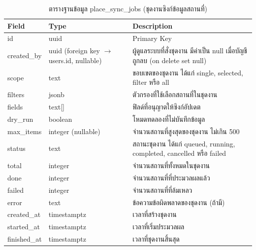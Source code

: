 \begin{table}[H]
\centering
\caption{ตารางฐานข้อมูล place\_sync\_jobs (ชุดงานซิงก์ข้อมูลสถานที่)}
\label{tab:db_sync}
\begin{tabular}{|p{3.6cm}|p{2.6cm}|p{6.8cm}|}
\hline
\textbf{Field} & \textbf{Type} & \textbf{Description} \\
\hline
id & uuid & Primary Key \\ \hline
created\_by & uuid (foreign key $\to$ users.id, nullable) & ผู้ดูแลระบบที่สั่งชุดงาน มีค่าเป็น null เมื่อบัญชีถูกลบ (on delete set null) \\ \hline
scope & text & ขอบเขตของชุดงาน ได้แก่ single, selected, filter หรือ all \\ \hline
filters & jsonb & ตัวกรองที่ใช้เลือกสถานที่ในชุดงาน \\ \hline
fields & text[] & ฟิลด์ที่อนุญาตให้ซิงก์อัปเดต \\ \hline
dry\_run & boolean & โหมดทดลองที่ไม่บันทึกข้อมูล \\ \hline
max\_items & integer (nullable) & จำนวนสถานที่สูงสุดของชุดงาน ไม่เกิน 500 \\ \hline
status & text & สถานะชุดงาน ได้แก่ queued, running, completed, cancelled หรือ failed \\ \hline
total & integer & จำนวนสถานที่ทั้งหมดในชุดงาน \\ \hline
done & integer & จำนวนสถานที่ที่ประมวลผลแล้ว \\ \hline
failed & integer & จำนวนสถานที่ที่ล้มเหลว \\ \hline
error & text & ข้อความข้อผิดพลาดของชุดงาน (ถ้ามี) \\ \hline
created\_at & timestamptz & เวลาที่สร้างชุดงาน \\ \hline
started\_at & timestamptz & เวลาที่เริ่มประมวลผล \\ \hline
finished\_at & timestamptz & เวลาที่ชุดงานสิ้นสุด \\
\hline
\end{tabular}
\end{table}

